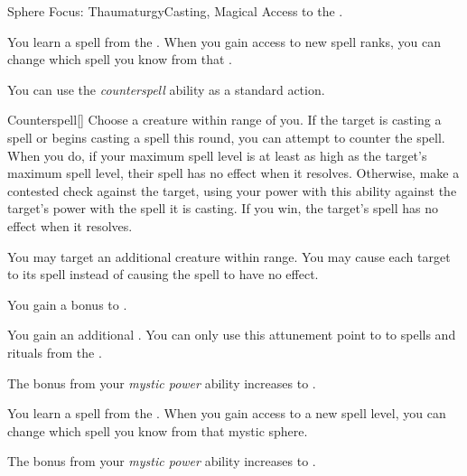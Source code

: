     \begin{feat}{Sphere Focus: Thaumaturgy}{Casting, Magical}
        \featpre Access to the  .

         You learn a spell from the  .
        When you gain access to new spell ranks, you can change which spell you know from that .

         You can use the \textit{counterspell} ability as a standard action.
        \begin{freeability}{Counterspell}[]
            Choose a creature within \rngmed range of you.
            If the target is casting a spell or begins casting a spell this round, you can attempt to counter the spell.
            When you do, if your maximum spell level is at least as high as the target's maximum spell level, their spell has no effect when it resolves.
            Otherwise, make a contested  check against the target, using your power with this ability against the target's power with the spell it is casting.
            If you win, the target's spell has no effect when it resolves.

            \rankline
             You may target an additional creature within range.
             You may cause each target to  its spell instead of causing the spell to have no effect.
        \end{freeability}

         You gain a  bonus to  .

         You gain an additional .
        You can only use this attunement point to  to spells and rituals from the  .

         The bonus from your \textit{mystic power} ability increases to .

         You learn a spell from the  .
        When you gain access to a new spell level, you can change which spell you know from that mystic sphere.

         The bonus from your \textit{mystic power} ability increases to .
    \end{feat}

